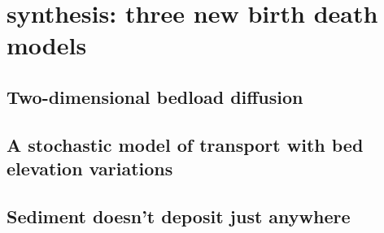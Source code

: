 \section{synthesis: three new birth death models} 
\label{sec:extension} 

\subsection{ Two-dimensional bedload diffusion} 

\subsection{ A stochastic model of transport with bed elevation variations } 

\subsection{ Sediment doesn't deposit just anywhere }



